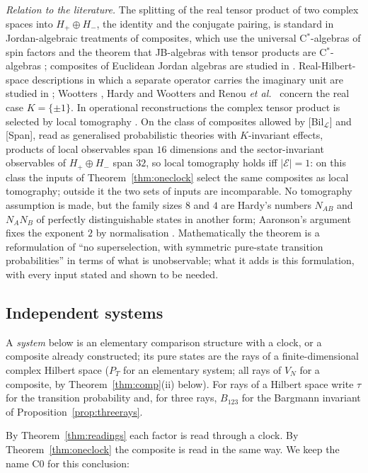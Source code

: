 \documentclass[aps,pra,onecolumn,superscriptaddress,nofootinbib,10pt]{revtex4-2}
\theoremstyle{definition}
\theoremstyle{remark}
\newcommand{\cL}{\mathcal{L}}
\begin{document}
\emph{Relation to the literature.}  The splitting of the real tensor product of two complex spaces
into $H_+\oplus H_-$, the identity and the conjugate pairing, is standard in Jordan-algebraic treatments of
composites, which use the universal C$^*$-algebras of spin factors \cite{HancheOlsen83} and the theorem
that JB-algebras with tensor products are C$^*$-algebras \cite{HancheOlsen85}; composites of Euclidean
Jordan algebras are studied in \cite{BGW20}.  Real-Hilbert-space descriptions in which a separate
operator carries the imaginary unit are studied in \cite{McKagueMoscaGisin09,ABW13}; Wootters
\cite{Wootters12}, Hardy and Wootters \cite{HardyWootters12} and Renou \emph{et al.}\ \cite{Renou} concern the real
case $K=\{\pm1\}$.  In operational reconstructions the complex tensor product is selected by local
tomography \cite{Hardy,Barrett07,MMAP,DB}.  On the class of composites allowed by [Bil$_\cL$] and [Span],
read as generalised probabilistic theories with $K$-invariant effects, products of local observables span
$16$ dimensions and the sector-invariant observables of $H_+\oplus H_-$ span $32$, so local tomography holds iff
$\lvert\mathcal E\rvert=1$: on this class the inputs of Theorem~\ref{thm:oneclock} select the same composites as local
tomography; outside it the two sets of inputs are incomparable.  No tomography assumption is made, but
the family sizes $8$ and $4$ are Hardy's numbers $N_{AB}$ and $N_AN_B$ of perfectly distinguishable states in
another form; Aaronson's argument fixes the exponent $2$ by normalisation \cite{Aaronson04}.
Mathematically the theorem is a reformulation of ``no superselection, with symmetric pure-state
transition probabilities'' in terms of what is unobservable; what it adds is this formulation, with
every input stated and shown to be needed.

\subsection{Independent systems}
A \emph{system} below is an elementary comparison structure with a clock, or a composite already
constructed; its pure states are the rays of a finite-dimensional complex Hilbert space ($P_T$ for an
elementary system; all rays of $V_N$ for a composite, by Theorem~\ref{thm:comp}(ii) below).  For rays
of a Hilbert space write $\tau$ for the transition probability and, for three rays, $B_{123}$ for the
Bargmann invariant of Proposition~\ref{prop:threerays}.

By Theorem~\ref{thm:readings} each factor is read through a clock.  By Theorem~\ref{thm:oneclock} the
composite is read in the same way.  We keep the name C0 for this conclusion:
\end{document}
